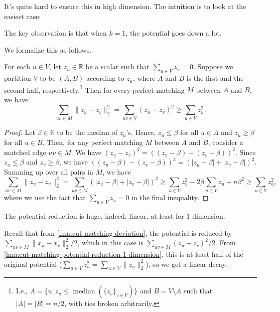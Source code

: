 It's quite hard to ensure this in high dimension. The intuition is to look at the easiest case:

\begin{intuition}
	The key observation is that when \(k = 1\), the potential goes down a lot.
\end{intuition}

We formalize this as follows.

\begin{lemma}\label{lma:cut-matching-potential-reduction-1-dimension}
	For each \(u \in V\), let \(z_u \in \mathbb{R} \) be a scalar such that \(\sum_{u \in V} z_u = 0\). Suppose we partition \(V\) to be \((A, B)\) according to \(z_u\), where \(A\) and \(B\) is the first and the second half, respectively.\footnote{I.e., \(A = \{ u \colon z_u \leq \operatorname{median}(\{ z_v\} _{v \in V}) \} \) and \(B = V \setminus A\) such that \(\lvert A \rvert = \lvert B \rvert = n / 2\), with ties broken arbitrarily.} Then for every perfect matching \(M\) between \(A\) and \(B\), we have
	\[
		\sum_{uv \in M} \lVert z_u - z_v \rVert _2^2
		= \sum_{uv \in V} (z_u - z_v)^2
		\geq \sum_{u \in V} z_u^2.
	\]
\end{lemma}
\begin{proof}
	Let \(\beta \in \mathbb{R} \) to be the median of \(z_u\)'s. Hence, \(z_u \leq \beta \) for all \(u \in A\) and \(z_u \geq \beta \) for all \(u \in B\). Then, for any perfect matching \(M\) between \(A\) and \(B\), consider a matched edge \(uv \in M\). We have \((z_u - z_v)^2 = ((z_u - \beta) - (z_v - \beta ))^2\). Since \(z_u \leq \beta \) and \(z_v \geq \beta \), we have \(((z_u - \beta ) - (z_v - \beta ))^2 = (\lvert z_u - \beta \rvert + \lvert z_v - \beta \rvert )^2\). Summing up over all pairs in \(M\), we have
	\[
		\sum_{uv \in M} \lVert z_u - z_v \rVert _2^2
		= \sum_{uv \in M} (\lvert z_u - \beta \rvert + \lvert z_v - \beta \rvert )^2
		\geq \sum_{u \in V} z_u^2 - 2\beta \sum_{u \in V} z_u + n \beta ^2
		\geq \sum_{u \in V} z_u^2,
	\]
	where we use the fact that \(\sum_{u \in V} z_u = 0\) in the final inequality.
\end{proof}

\begin{remark}
	The potential reduction is huge, indeed, linear, at least for \(1\) dimension.
\end{remark}
\begin{explanation}
	Recall that from \autoref{lma:cut-matching-deviation}, the potential is reduced by \(\sum_{uv \in M} \lVert x_u - x_v \rVert _2^2 / 2\), which in this case is \(\sum_{uv \in M} (z_u - z_v)^2 / 2\). From \autoref{lma:cut-matching-potential-reduction-1-dimension}, this is at least half of the original potential (\(\sum_{u \in V} z_u^2 = \sum_{u \in V} \lVert z_u \rVert _2^2\)), so we get a linear decay.
\end{explanation}

